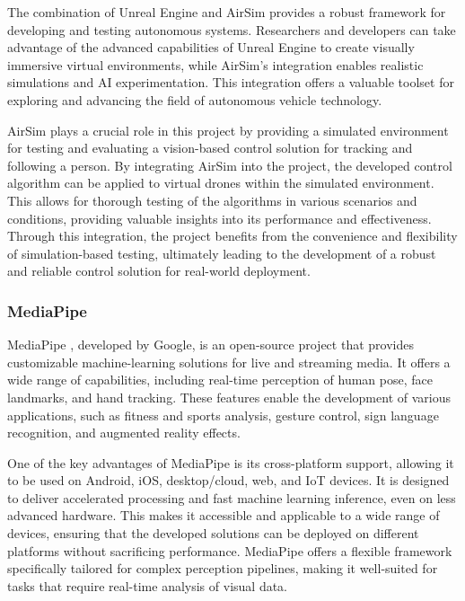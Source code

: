 The combination of Unreal Engine and AirSim provides a robust framework for developing and testing autonomous systems. Researchers and developers can take advantage of the advanced capabilities of Unreal Engine to create visually immersive virtual environments, while AirSim's integration enables realistic simulations and AI experimentation. This integration offers a valuable toolset for exploring and advancing the field of autonomous vehicle technology.

AirSim plays a crucial role in this project by providing a simulated environment for testing and evaluating a vision-based control solution for tracking and following a person. By integrating AirSim into the project, the developed control algorithm can be applied to virtual drones within the simulated environment. This allows for thorough testing of the algorithms in various scenarios and conditions, providing valuable insights into its performance and effectiveness. Through this integration, the project benefits from the convenience and flexibility of simulation-based testing, ultimately leading to the development of a robust and reliable control solution for real-world deployment.


\subsubsection{MediaPipe}
\label{subsec:mediapipe}
MediaPipe \cite{mediapipe-front}, developed by Google, is an open-source project that provides customizable machine-learning solutions for live and streaming media. It offers a wide range of capabilities, including real-time perception of human pose, face landmarks, and hand tracking. These features enable the development of various applications, such as fitness and sports analysis, gesture control, sign language recognition, and augmented reality effects.

One of the key advantages of MediaPipe is its cross-platform support, allowing it to be used on Android, iOS, desktop/cloud, web, and IoT devices. It is designed to deliver accelerated processing and fast machine learning inference, even on less advanced hardware. This makes it accessible and applicable to a wide range of devices, ensuring that the developed solutions can be deployed on different platforms without sacrificing performance.
MediaPipe offers a flexible framework specifically tailored for complex perception pipelines, making it well-suited for tasks that require real-time analysis of visual data. 

